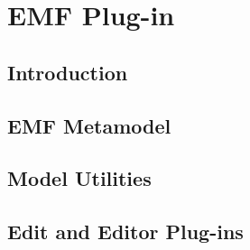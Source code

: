 \chapter{\label{emf}EMF Plug-in}
\section{\label{emf:intro}Introduction}
\section{\label{emf:mm}EMF Metamodel}
\section{\label{emf:util}Model Utilities}
\section{\label{emf:edit}Edit and Editor Plug-ins}

